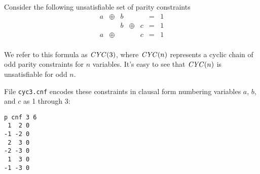 Consider the following unsatisfiable set of parity constraints
\begin{displaymath}
\begin{array}{ccccccc}
a & \oplus & b  &        &   & = & 1 \\
  &        & b  & \oplus & c & = & 1 \\
a & \oplus &    &        & c & = & 1 \\
\end{array}
\end{displaymath}

We refer to this formula as ${\it CYC}(3)$, where ${\it CYC}(n)$
represents a cyclic chain of odd parity constraints for $n$ variables.
It's easy to see that ${\it CYC}(n)$ is unsatisfiable for odd $n$.

File
\texttt{cyc3.cnf} encodes these constraints in clausal form
numbering variables $a$, $b$, and $c$ as 1 through 3:
\begin{lstlisting}
p cnf 3 6
 1  2 0
-1 -2 0
 2  3 0
-2 -3 0
 1  3 0
-1 -3 0
\end{lstlisting}

\newpage

